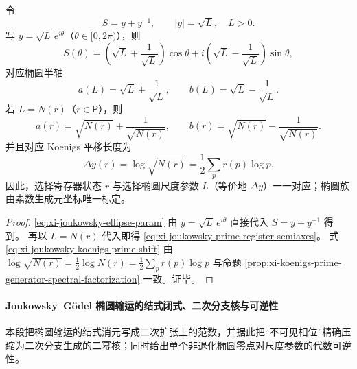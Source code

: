 \begin{corollary}\label{cor:xi-joukowsky-prime-register-ellipse-parameterization}
令
\[
S=y+y^{-1},\qquad
|y|=\sqrt L,\quad L>0.
\]
写 \(y=\sqrt L\,e^{i\theta}\)（\(\theta\in[0,2\pi)\)），则
\begin{equation}\label{eq:xi-joukowsky-ellipse-param}
S(\theta)
=
\left(\sqrt L+\frac{1}{\sqrt L}\right)\cos\theta
+i\left(\sqrt L-\frac{1}{\sqrt L}\right)\sin\theta,
\end{equation}
对应椭圆半轴
\[
a(L)=\sqrt L+\frac{1}{\sqrt L},
\qquad
b(L)=\sqrt L-\frac{1}{\sqrt L}.
\]
若 \(L=N(r)\)（\(r\in\mathsf P\)），则
\begin{equation}\label{eq:xi-joukowsky-prime-register-semiaxes}
a(r)=\sqrt{N(r)}+\frac{1}{\sqrt{N(r)}},
\qquad
b(r)=\sqrt{N(r)}-\frac{1}{\sqrt{N(r)}}.
\end{equation}
并且对应 Koenigs 平移长度为
\begin{equation}\label{eq:xi-joukowsky-koenigs-prime-shift}
\Delta y(r)=\log\sqrt{N(r)}
=\frac12\sum_{p}r(p)\log p.
\end{equation}
因此，选择寄存器状态 \(r\) 与选择椭圆尺度参数 \(L\)（等价地 \(\Delta y\)）一一对应；椭圆族由素数生成元坐标唯一标定。
\end{corollary}
\begin{proof}
\eqref{eq:xi-joukowsky-ellipse-param}
由 \(y=\sqrt L\,e^{i\theta}\) 直接代入 \(S=y+y^{-1}\) 得到。
再以 \(L=N(r)\) 代入即得
\eqref{eq:xi-joukowsky-prime-register-semiaxes}。
式
\eqref{eq:xi-joukowsky-koenigs-prime-shift}
由
\(
\log\sqrt{N(r)}=\frac12\log N(r)=\frac12\sum_p r(p)\log p
\)
与命题 \ref{prop:xi-koenigs-prime-generator-spectral-factorization}
一致。证毕。
\end{proof}

\paragraph{Joukowsky--Gödel 椭圆输运的结式闭式、二次分支核与可逆性}
本段把椭圆输运的结式消元写成二次扩张上的范数，并据此把“不可见相位”精确压缩为二次分支生成的二幂核；同时给出单个非退化椭圆零点对尺度参数的代数可逆性。

